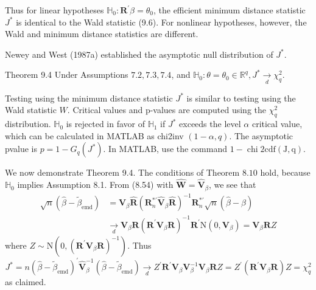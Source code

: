 \documentclass[10pt]{article}
\begin{document}
Thus for linear hypotheses $\mathbb{H}_{0}: \boldsymbol{R}^{\prime} \beta=\theta_{0}$, the efficient minimum distance statistic $J^{*}$ is identical to the Wald statistic (9.6). For nonlinear hypotheses, however, the Wald and minimum distance statistics are different.

Newey and West (1987a) established the asymptotic null distribution of $J^{*}$.

Theorem 9.4 Under Assumptions $7.2,7.3,7.4$, and $\mathbb{H}_{0}: \theta=\theta_{0} \in \mathbb{R}^{q}, J^{*} \underset{d}{\longrightarrow} \chi_{q}^{2}$.

Testing using the minimum distance statistic $J^{*}$ is similar to testing using the Wald statistic $W$. Critical values and p-values are computed using the $\chi_{q}^{2}$ distribution. $\mathbb{H}_{0}$ is rejected in favor of $\mathbb{H}_{1}$ if $J^{*}$ exceeds the level $\alpha$ critical value, which can be calculated in MATLAB as chi2inv $(1-\alpha, q)$. The asymptotic pvalue is $p=1-G_{q}\left(J^{*}\right)$. In MATLAB, use the command $1-\operatorname{chi} 2 \mathrm{cdf}(\mathrm{J}, \mathrm{q})$.

We now demonstrate Theorem 9.4. The conditions of Theorem $8.10$ hold, because $\mathbb{H}_{0}$ implies Assumption 8.1. From (8.54) with $\widehat{\boldsymbol{W}}=\widehat{\boldsymbol{V}}_{\beta}$, we see that
$$
\begin{aligned}
\sqrt{n}\left(\widehat{\beta}-\widetilde{\beta}_{\mathrm{emd}}\right) &=\widehat{\boldsymbol{V}}_{\beta} \widehat{\boldsymbol{R}}\left(\boldsymbol{R}_{n}^{* \prime} \widehat{\boldsymbol{V}}_{\beta} \widehat{\boldsymbol{R}}\right)^{-1} \boldsymbol{R}_{n}^{* \prime} \sqrt{n}(\widehat{\beta}-\beta) \\
& \underset{d}{\longrightarrow} \boldsymbol{V}_{\beta} \boldsymbol{R}\left(\boldsymbol{R}^{\prime} \boldsymbol{V}_{\beta} \boldsymbol{R}\right)^{-1} \boldsymbol{R}^{\prime} \mathrm{N}\left(0, \boldsymbol{V}_{\beta}\right)=\boldsymbol{V}_{\beta} \boldsymbol{R} Z
\end{aligned}
$$
where $Z \sim \mathrm{N}\left(0,\left(\boldsymbol{R}^{\prime} \boldsymbol{V}_{\beta} \boldsymbol{R}\right)^{-1}\right)$. Thus
$$
J^{*}=n\left(\widehat{\beta}-\widetilde{\beta}_{\mathrm{emd}}\right)^{\prime} \widehat{\boldsymbol{V}}_{\beta}^{-1}\left(\widehat{\beta}-\widetilde{\beta}_{\mathrm{emd}}\right) \underset{d}{\longrightarrow} Z^{\prime} \boldsymbol{R}^{\prime} \boldsymbol{V}_{\beta} \boldsymbol{V}_{\beta}^{-1} \boldsymbol{V}_{\beta} \boldsymbol{R} Z=Z^{\prime}\left(\boldsymbol{R}^{\prime} \boldsymbol{V}_{\beta} \boldsymbol{R}\right) Z=\chi_{q}^{2}
$$
as claimed.
\end{document}
